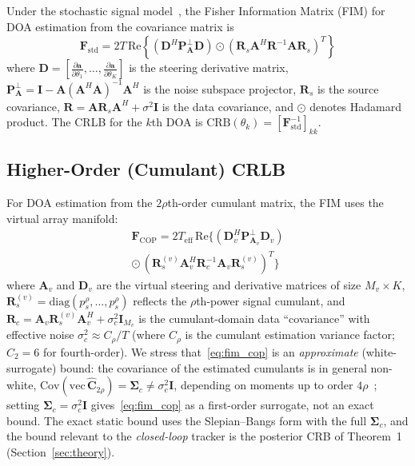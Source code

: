 \documentclass[journal]{IEEEtran}
\newcommand{\mat}[1]{\mathbf{#1}}
\newcommand{\diag}{\mathrm{diag}}
\newcommand{\Real}{\mathrm{Re}}
\begin{document}
Under the stochastic signal model~\cite{stoica1989music}, the Fisher Information Matrix (FIM) for DOA estimation from the covariance matrix is
\begin{equation}
\mat{F}_{\mathrm{std}} = 2T\,\Real\!\left\{(\mat{D}^H\mat{P}_{\mat{A}}^\perp\mat{D}) \odot (\mat{R}_s\mat{A}^H\mat{R}^{-1}\mat{A}\mat{R}_s)^T\right\}
\label{eq:fim_std}
\end{equation}
where $\mat{D} = [\frac{\partial\mat{a}}{\partial\theta_1}, \ldots, \frac{\partial\mat{a}}{\partial\theta_K}]$ is the steering derivative matrix, $\mat{P}_{\mat{A}}^\perp = \mat{I} - \mat{A}(\mat{A}^H\mat{A})^{-1}\mat{A}^H$ is the noise subspace projector, $\mat{R}_s$ is the source covariance, $\mat{R} = \mat{A}\mat{R}_s\mat{A}^H + \sigma^2\mat{I}$ is the data covariance, and $\odot$ denotes Hadamard product. The CRLB for the $k$th DOA is $\mathrm{CRB}(\theta_k) = [\mat{F}_{\mathrm{std}}^{-1}]_{kk}$.

\subsection{Higher-Order (Cumulant) CRLB}

For DOA estimation from the $2\rho$th-order cumulant matrix, the FIM uses the virtual array manifold:
\begin{multline}
\mat{F}_{\mathrm{COP}} = 2T_{\mathrm{eff}}\,\Real\!\big\{(\mat{D}_v^H\mat{P}_{\mat{A}_v}^\perp\mat{D}_v) \\
\odot\, (\mat{R}_s^{(v)}\mat{A}_v^H\mat{R}_c^{-1}\mat{A}_v\mat{R}_s^{(v)})^T\big\}
\label{eq:fim_cop}
\end{multline}
where $\mat{A}_v$ and $\mat{D}_v$ are the virtual steering and derivative matrices of size $M_v \times K$, $\mat{R}_s^{(v)} = \diag(p_s^\rho, \ldots, p_s^\rho)$ reflects the $\rho$th-power signal cumulant, and $\mat{R}_c = \mat{A}_v\mat{R}_s^{(v)}\mat{A}_v^H + \sigma_c^2\mat{I}_{M_v}$ is the cumulant-domain data ``covariance'' with effective noise $\sigma_c^2 \approx C_\rho / T$ (where $C_\rho$ is the cumulant estimation variance factor; $C_2 = 6$ for fourth-order). We stress that~\eqref{eq:fim_cop} is an \emph{approximate} (white-surrogate) bound: the covariance of the estimated cumulants is in general non-white, $\mathrm{Cov}(\mathrm{vec}\,\hat{\mat{C}}_{2\rho})=\mat{\Sigma}_c\neq\sigma_c^2\mat{I}$, depending on moments up to order $4\rho$~\cite{mendel1991tutorial,dogan1995cumulant}; setting $\mat{\Sigma}_c=\sigma_c^2\mat{I}$ gives~\eqref{eq:fim_cop} as a first-order surrogate, not an exact bound. The exact static bound uses the Slepian--Bangs form with the full $\mat{\Sigma}_c$, and the bound relevant to the \emph{closed-loop} tracker is the posterior CRB of Theorem~1 (Section~\ref{sec:theory}).
\end{document}
